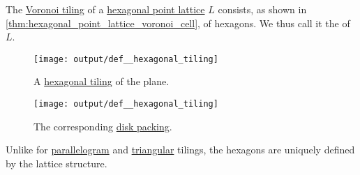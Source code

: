 \begin{definition}\label{def:hexagonal_tiling}\mimprovised
  The \hyperref[def:voronoi_tiling]{Voronoi tiling} of a \hyperref[def:hexagonal_point_lattice]{hexagonal point lattice} \( L \) consists, as shown in \cref{thm:hexagonal_point_lattice_voronoi_cell}, of hexagons. We thus call it the  of \( L \).

  \begin{figure}[!ht]
    \begin{subcaptionblock}[t]{0.45\linewidth}
      \centering
      \texttt{[image: output/def\_\_hexagonal\_tiling]}
      \caption{A \hyperref[def:hexagonal_tiling]{hexagonal tiling} of the plane.}\label{fig:def:hexagonal_tiling/tiling}
    \end{subcaptionblock}
    \hfill
    \begin{subcaptionblock}[t]{0.45\linewidth}
      \centering
      \texttt{[image: output/def\_\_hexagonal\_tiling]}
      \caption{The corresponding \hyperref[def:lattice_ball_packing]{disk packing}.}\label{fig:def:hexagonal_tiling/packing}
    \end{subcaptionblock}
  \end{figure}
\end{definition}
\begin{comments}
  \item Unlike for \hyperref[def:parallelogram_tiling]{parallelogram} and \hyperref[def:triangular_tiling]{triangular} tilings, the hexagons are uniquely defined by the lattice structure.
\end{comments}
